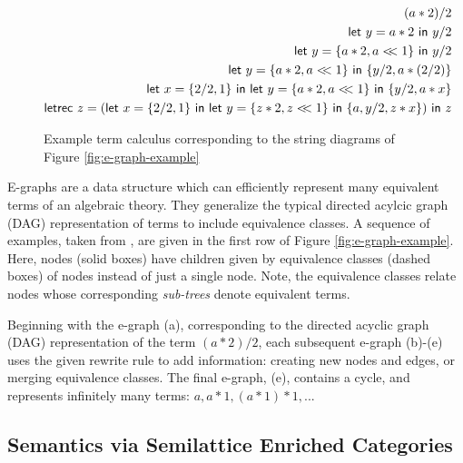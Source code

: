 \begin{figure}\label{fig:let-calculus}
\begin{align*}
    (a*2)/2 \\
    \mylet{y}{a*2} y/2 \\ 
    \mylet{y}{\{a*2,a<\!\!<1\}} y/2 \\
    \mylet{y}{\{a*2,a<\!\!<1\}} \{y/2, a*(2/2)\} \\
    \mylet{x}{\{2/2, 1\}} \mylet{y}{\{a*2, a <\!\!< 1\}} \{y/2, a*x\} \\
    \textsf{letrec } z = (\mylet{x}{\{2/2, 1\}} \mylet{y}{\{z*2, z <\!\!< 1\}} \{a, y/2, z*x\}) \textsf{ in } z
\end{align*}
\caption{Example term calculus corresponding to the string diagrams of Figure \ref{fig:e-graph-example}}
\end{figure}

E-graphs are a data structure which can efficiently represent many equivalent terms of an algebraic theory. They generalize the typical directed acylcic graph (DAG) representation of terms to include equivalence classes. 
A sequence of examples, taken from \cite{EggPaper}, are given in the first row of Figure \ref{fig:e-graph-example}. Here, nodes (solid boxes) have children given by equivalence classes (dashed boxes) of nodes instead of just a single node. Note, the equivalence classes relate nodes whose corresponding \textit{sub-trees} denote equivalent terms. 

Beginning with the e-graph (a), corresponding to the directed acyclic graph (DAG) representation of the term $(a*2)/2$, each subsequent e-graph (b)-(e) uses the given rewrite rule to add information: creating new nodes and edges, or merging equivalence classes. The final e-graph, (e), contains a cycle, and represents infinitely many terms: $a, a*1, (a*1)*1, $... 

\subsection*{Semantics via Semilattice Enriched Categories}

